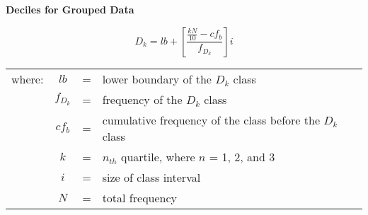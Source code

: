 \begin{center}
\textbf{Deciles for Grouped Data}
\end{center}

\vspace*{1ex}

\[
D_k=lb + \left[\displaystyle \frac{\displaystyle \frac{kN}{10} - cf_b}{f_{D_k}} \right]i
\] 


\begin{center}
\begin{tabular}{lcll}
where: & $lb$ & = & lower boundary of the $D_k$ class \\
 & $f_{D_k} $& = & frequency of the $D_k$ class \\
& $cf_b$ & = & \makecell[tl]{cumulative frequency of the  class \\ before  the $D_k$ class} \\ 
& $k $ & = & $n_{th} $ quartile, where $n$ = 1, 2, and 3 \\ 
& $i$ & = & size of class interval\\ 
& $N$ & = & total frequency \\ 
\end{tabular} 
\end{center}